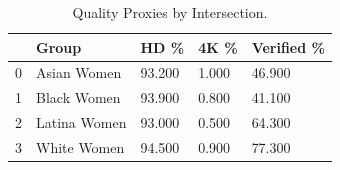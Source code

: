 \begin{table}[htbp]
\centering
\caption{Quality Proxies by Intersection.}
\label{tab:eda_quality_proxies_by_group}
\begin{tabular}{lllll}
\toprule
 & Group & HD \% & 4K \% & Verified \% \\
\midrule
0 & Asian Women & 93.200 & 1.000 & 46.900 \\
1 & Black Women & 93.900 & 0.800 & 41.100 \\
2 & Latina Women & 93.000 & 0.500 & 64.300 \\
3 & White Women & 94.500 & 0.900 & 77.300 \\
\bottomrule
\end{tabular}

\end{table}